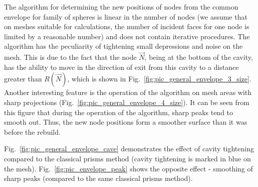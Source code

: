 \documentclass[
11pt,%
tightenlines,%
twoside,%
onecolumn,%
nofloats,%
nobibnotes,%
nofootinbib,%
superscriptaddress,%
noshowpacs,%
centertags]%
{revtex4-2}
\begin{document}
The algorithm for determining the new positions of nodes from the common envelope for family of spheres is linear in the number of nodes (we assume that on meshes suitable for calculations, the number of incident faces for one node is limited by a reasonable number) and does not contain iterative procedures.
The algorithm has the peculiarity of tightening small depressions and noise on the mesh.
This is due to the fact that the node $\vec{N}$, being at the bottom of the cavity, has the ability to move in the direction of exit from this cavity to a distance greater than $R(\vec{N})$, which is shown in Fig.~\ref{fig:pic_general_envelope_3_size}.
Another interesting feature is the operation of the algorithm on mesh areas with sharp projections (Fig.~\ref{fig:pic_general_envelope_4_size}).
It can be seen from this figure that during the operation of the algorithm, sharp peaks tend to smooth out.
Thus, the new node positions form a smoother surface than it was before the rebuild.

Fig.~\ref{fig:pic_general_envelope_cave} demonstrates the effect of cavity tightening compared to the classical prisms method (cavity tightening is marked in blue on the mesh).
Fig.~\ref{fig:pic_envelope_peak} shows the opposite effect - smoothing of sharp peaks (compared to the same classical prisms method).
\end{document}
